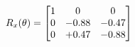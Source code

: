 \documentclass[preview]{standalone}
\begin{document}
\begin{align*}
\special{dvisvgm:raw <g id='unique000'>}R_{x}(\theta) = \begin{bmatrix}1 & 0 & 0 \\0 & -0.88 & -0.47 \\0 & +0.47 & -0.88\end{bmatrix}\special{dvisvgm:raw </g>}
\end{align*}
\end{document}
